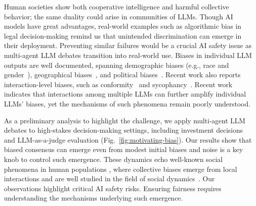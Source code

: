 \documentclass{article}
\theoremstyle{plain}
\theoremstyle{definition}
\theoremstyle{remark}
\begin{document}
Human societies show both cooperative intelligence and harmful collective behavior; the same duality could arise in communities of LLMs. 
Though AI models have great advantages, real-world examples such as algorithmic bias in legal decision-making \cite{angwin2022machine} remind us that unintended discrimination can emerge in their deployment. 
Preventing similar failures would be a crucial AI safety issue as multi-agent LLM debates transition into real-world use. 
Biases in individual LLM outputs are well documented, spanning demographic biases (e.g., race and gender~\cite{liu-etal-2024-confronting}), geographical biases~\cite{manvi2024geographical}, and political biases~\cite{santurkar2023}. Recent work also reports interaction-level biases, such as conformity~\cite{chen2023agentverse,choi2025empirical} and sycophancy~\cite{zheng2023judging}. 
Recent work \cite{borah-mihalcea-2024-towards,oh2025understanding} indicates that interactions among multiple LLMs can further amplify individual LLMs' biases, yet the mechanisms of such phenomena remain poorly understood. 

As a preliminary analysis to highlight the challenge, we apply multi-agent LLM debates to high-stakes decision-making settings, including investment decisions and LLM-as-a-judge evaluation (Fig.~\ref{fig:motivating-bias}). 
Our results show that biased consensus can emerge even from modest initial biases and noise is a key knob to control such emergence. These dynamics echo well-known social phenomena in human populations \cite{martell2012bias, yasar2025emergence}, where collective biases emerge from local interactions and are well studied in the field of social dynamics~\cite{weidlich2006sociodynamics}. 
Our observations highlight critical AI safety risks. Ensuring fairness requires understanding the mechanisms underlying such emergence. 
\end{document}
